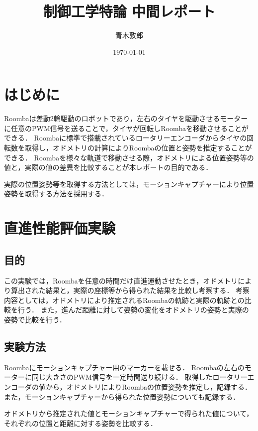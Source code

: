 \documentclass[a4paper,11pt]{jsarticle}
\begin{document}
\title{制御工学特論 中間レポート}
\author{青木敦郎}
\date{\today}
\maketitle

\section{はじめに}
Roombaは差動2輪駆動のロボットであり，左右のタイヤを駆動させるモーターに任意のPWM信号を送ることで，タイヤが回転しRoombaを移動させることができる．
Roombaに標準で搭載されているロータリーエンコーダからタイヤの回転数を取得し，オドメトリの計算によりRoombaの位置と姿勢を推定することができる．
Roombaを様々な軌道で移動させる際，オドメトリによる位置姿勢等の値と，実際の値の差異を比較することが本レポートの目的である．\par
実際の位置姿勢等を取得する方法としては，モーションキャプチャーにより位置姿勢を取得する方法を採用する．

\section{直進性能評価実験}

\subsection{目的}
この実験では，Roombaを任意の時間だけ直進運動させたとき，オドメトリにより算出された結果と，実際の座標等から得られた結果を比較し考察する．
考察内容としては，オドメトリにより推定されるRoombaの軌跡と実際の軌跡との比較を行う．
また，進んだ距離に対して姿勢の変化をオドメトリの姿勢と実際の姿勢で比較を行う．

\subsection{実験方法}
Roombaにモーションキャプチャー用のマーカーを載せる．
Roombaの左右のモーターに同じ大きさのPWM信号を一定時間送り続ける．
取得したロータリーエンコーダの値から，オドメトリによりRoombaの位置姿勢を推定し，記録する．
また，モーションキャプチャーから得られた位置姿勢についても記録する．\par
オドメトリから推定された値とモーションキャプチャーで得られた値について，
それぞれの位置と距離に対する姿勢を比較する．
\end{document}
